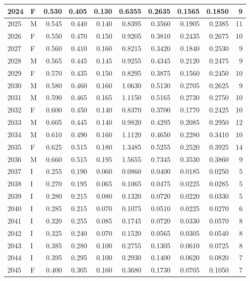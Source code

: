 \documentclass[9pt,twocolumn,twoside,]{pnas-new}
\begin{document}
\begin{tabular}{l|l|r|r|r|r|r|r|r|r}
\hline
2024 & F & 0.530 & 0.405 & 0.130 & 0.6355 & 0.2635 & 0.1565 & 0.1850 & 9\\
\hline
2025 & M & 0.545 & 0.440 & 0.140 & 0.8395 & 0.3560 & 0.1905 & 0.2385 & 11\\
\hline
2026 & F & 0.550 & 0.470 & 0.150 & 0.9205 & 0.3810 & 0.2435 & 0.2675 & 10\\
\hline
2027 & F & 0.560 & 0.410 & 0.160 & 0.8215 & 0.3420 & 0.1840 & 0.2530 & 9\\
\hline
2028 & M & 0.565 & 0.445 & 0.145 & 0.9255 & 0.4345 & 0.2120 & 0.2475 & 9\\
\hline
2029 & F & 0.570 & 0.435 & 0.150 & 0.8295 & 0.3875 & 0.1560 & 0.2450 & 10\\
\hline
2030 & M & 0.580 & 0.460 & 0.160 & 1.0630 & 0.5130 & 0.2705 & 0.2625 & 9\\
\hline
2031 & M & 0.590 & 0.465 & 0.165 & 1.1150 & 0.5165 & 0.2730 & 0.2750 & 10\\
\hline
2032 & F & 0.600 & 0.450 & 0.140 & 0.8370 & 0.3700 & 0.1770 & 0.2425 & 10\\
\hline
2033 & M & 0.605 & 0.445 & 0.140 & 0.9820 & 0.4295 & 0.2085 & 0.2950 & 12\\
\hline
2034 & M & 0.610 & 0.490 & 0.160 & 1.1120 & 0.4650 & 0.2280 & 0.3410 & 10\\
\hline
2035 & F & 0.625 & 0.515 & 0.180 & 1.3485 & 0.5255 & 0.2520 & 0.3925 & 14\\
\hline
2036 & M & 0.660 & 0.515 & 0.195 & 1.5655 & 0.7345 & 0.3530 & 0.3860 & 9\\
\hline
2037 & I & 0.255 & 0.190 & 0.060 & 0.0860 & 0.0400 & 0.0185 & 0.0250 & 5\\
\hline
2038 & I & 0.270 & 0.195 & 0.065 & 0.1065 & 0.0475 & 0.0225 & 0.0285 & 5\\
\hline
2039 & I & 0.280 & 0.215 & 0.080 & 0.1320 & 0.0720 & 0.0220 & 0.0330 & 5\\
\hline
2040 & I & 0.285 & 0.215 & 0.070 & 0.1075 & 0.0510 & 0.0225 & 0.0270 & 6\\
\hline
2041 & I & 0.320 & 0.255 & 0.085 & 0.1745 & 0.0720 & 0.0330 & 0.0570 & 8\\
\hline
2042 & I & 0.325 & 0.240 & 0.070 & 0.1520 & 0.0565 & 0.0305 & 0.0540 & 8\\
\hline
2043 & I & 0.385 & 0.280 & 0.100 & 0.2755 & 0.1305 & 0.0610 & 0.0725 & 8\\
\hline
2044 & I & 0.395 & 0.295 & 0.100 & 0.2930 & 0.1400 & 0.0620 & 0.0820 & 7\\
\hline
2045 & F & 0.400 & 0.305 & 0.160 & 0.3680 & 0.1730 & 0.0705 & 0.1050 & 7\\

\end{tabular}
\end{document}
